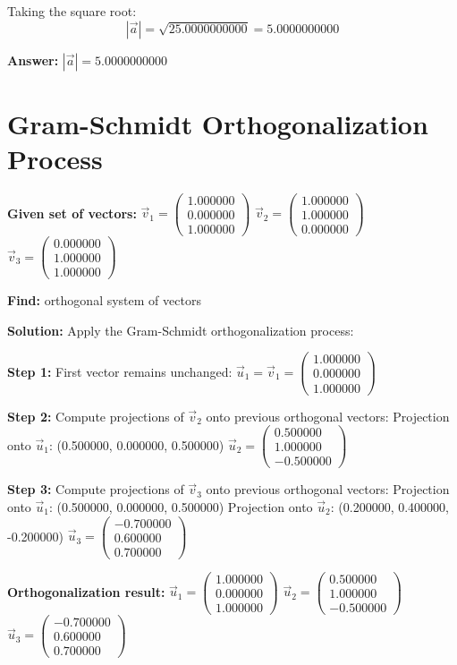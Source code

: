 \documentclass{article}
\begin{document}
Taking the square root:
\[
|\vec{a}| = \sqrt{25.0000000000} = 5.0000000000
\]

\textbf{Answer:} $|\vec{a}| = 5.0000000000$
\newpage

\section*{Gram-Schmidt Orthogonalization Process}
\textbf{Given set of vectors:}
$\vec{v}_{1} = \begin{pmatrix}1.000000 \\ 0.000000 \\ 1.000000\end{pmatrix}$
$\vec{v}_{2} = \begin{pmatrix}1.000000 \\ 1.000000 \\ 0.000000\end{pmatrix}$
$\vec{v}_{3} = \begin{pmatrix}0.000000 \\ 1.000000 \\ 1.000000\end{pmatrix}$

\textbf{Find:} orthogonal system of vectors

\textbf{Solution:}
Apply the Gram-Schmidt orthogonalization process:

\textbf{Step 1:} First vector remains unchanged:
$\vec{u}_1 = \vec{v}_1 = \begin{pmatrix}1.000000 \\ 0.000000 \\ 1.000000\end{pmatrix}$

\textbf{Step 2:}
Compute projections of $\vec{v}_{2}$ onto previous orthogonal vectors:
Projection onto $\vec{u}_{1}$: (0.500000, 0.000000, 0.500000)
$\vec{u}_{2} = \begin{pmatrix}0.500000 \\ 1.000000 \\ -0.500000\end{pmatrix}$

\textbf{Step 3:}
Compute projections of $\vec{v}_{3}$ onto previous orthogonal vectors:
Projection onto $\vec{u}_{1}$: (0.500000, 0.000000, 0.500000)
Projection onto $\vec{u}_{2}$: (0.200000, 0.400000, -0.200000)
$\vec{u}_{3} = \begin{pmatrix}-0.700000 \\ 0.600000 \\ 0.700000\end{pmatrix}$

\textbf{Orthogonalization result:}
$\vec{u}_{1} = \begin{pmatrix}1.000000 \\ 0.000000 \\ 1.000000\end{pmatrix}$
$\vec{u}_{2} = \begin{pmatrix}0.500000 \\ 1.000000 \\ -0.500000\end{pmatrix}$
$\vec{u}_{3} = \begin{pmatrix}-0.700000 \\ 0.600000 \\ 0.700000\end{pmatrix}$

\newpage
\end{document}
